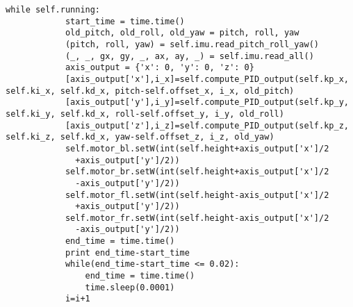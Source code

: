\begin{lstlisting}
while self.running:
            start_time = time.time()
            old_pitch, old_roll, old_yaw = pitch, roll, yaw
            (pitch, roll, yaw) = self.imu.read_pitch_roll_yaw()
            (_, _, gx, gy, _, ax, ay, _) = self.imu.read_all()
            axis_output = {'x': 0, 'y': 0, 'z': 0}
            [axis_output['x'],i_x]=self.compute_PID_output(self.kp_x, self.ki_x, self.kd_x, pitch-self.offset_x, i_x, old_pitch)
            [axis_output['y'],i_y]=self.compute_PID_output(self.kp_y, self.ki_y, self.kd_x, roll-self.offset_y, i_y, old_roll)
            [axis_output['z'],i_z]=self.compute_PID_output(self.kp_z, self.ki_z, self.kd_x, yaw-self.offset_z, i_z, old_yaw)
            self.motor_bl.setW(int(self.height+axis_output['x']/2
              +axis_output['y']/2))
            self.motor_br.setW(int(self.height+axis_output['x']/2
              -axis_output['y']/2))
            self.motor_fl.setW(int(self.height-axis_output['x']/2
              +axis_output['y']/2))
            self.motor_fr.setW(int(self.height-axis_output['x']/2
              -axis_output['y']/2))
            end_time = time.time()
            print end_time-start_time
            while(end_time-start_time <= 0.02):
                end_time = time.time()
                time.sleep(0.0001)
            i=i+1
\end{lstlisting} 
